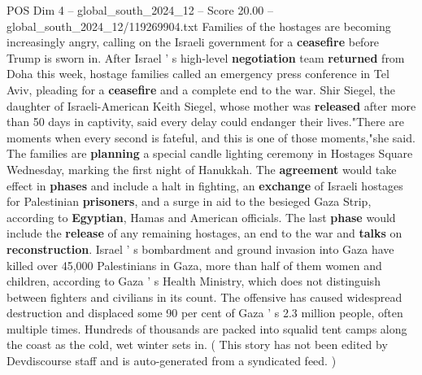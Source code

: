 \begin{textsample}{POS Dim 4 – global\_south\_2024\_12 – Score 20.00 – global\_south\_2024\_12/119269904.txt}
Families of the hostages are becoming increasingly angry, calling on the Israeli government for a \textbf{ceasefire} before Trump is sworn in.
After Israel ' s high-level \textbf{negotiation} team \textbf{returned} from Doha this week, hostage families called an emergency press conference in Tel Aviv, pleading for a \textbf{ceasefire} and a complete end to the war.
Shir Siegel, the daughter of Israeli-American Keith Siegel, whose mother was \textbf{released} after more than 50 days in captivity, said every delay could endanger their lives."There are moments when every second is fateful, and this is one of those moments,"she said.
The families are \textbf{planning} a special candle lighting ceremony in Hostages Square Wednesday, marking the first night of Hanukkah.
The \textbf{agreement} would take effect in \textbf{phases} and include a halt in fighting, an \textbf{exchange} of Israeli hostages for Palestinian \textbf{prisoners}, and a surge in aid to the besieged Gaza Strip, according to \textbf{Egyptian}, Hamas and American officials.
The last \textbf{phase} would include the \textbf{release} of any remaining hostages, an end to the war and \textbf{talks} on \textbf{reconstruction}.
Israel ' s bombardment and ground invasion into Gaza have killed over 45,000 Palestinians in Gaza, more than half of them women and children, according to Gaza ' s Health Ministry, which does not distinguish between fighters and civilians in its count.
The offensive has caused widespread destruction and displaced some 90 per cent of Gaza ' s 2.3 million people, often multiple times.
Hundreds of thousands are packed into squalid tent camps along the coast as the cold, wet winter sets in. ( This story has not been edited by Devdiscourse staff and is auto-generated from a syndicated feed. )

\end{textsample}

